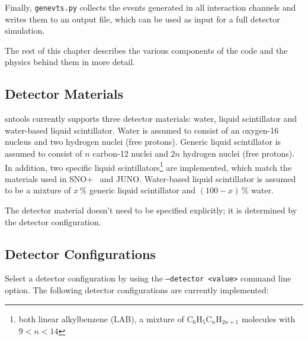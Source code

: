 \documentclass[11pt, oneside]{article}
\begin{document}
Finally, \texttt{genevts.py} collects the events generated in all interaction channels and writes them to an output file, which can be used as input for a full detector simulation.

The rest of this chapter describes the various components of the code and the physics behind them in more detail.


\subsection{Detector Materials}
sntools currently supports three detector materials: water, liquid scintillator and water-based liquid scintillator.
Water is assumed to consist of an oxygen-16 nucleus and two hydrogen nuclei (free protons).
Generic liquid scintillator is assumed to consist of $n$ carbon-12 nuclei and $2n$ hydrogen nuclei (free protons).
In addition, two specific liquid scintillators\footnote{both linear alkylbenzene (LAB), a mixture of C$_6$H$_5$C$_n$H$_{2n+1}$ molecules with $9<n<14$} are implemented, which match the materials used in SNO+~\cite{anderson2021development} and JUNO.
Water-based liquid scintillator is assumed to be a mixture of $x\,\%$ generic liquid scintillator and $(100-x)\,\%$ water.

The detector material doesn’t need to be specified explicitly; it is determined by the detector configuration.


\subsection{Detector Configurations}\label{sec:detector-configurations}
Select a detector configuration by using the \texttt{--detector <value>} command line option. The following detector configurations are currently implemented:
\end{document}
